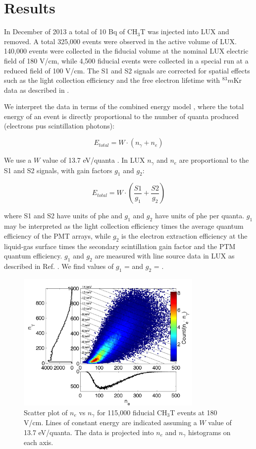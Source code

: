 \section{Results}

In December of 2013 a total of 10 Bq of CH$_3$T was injected into LUX and removed. A total 325,000 events were observed in the active volume of LUX. 140,000 events were collected in the fiducial volume at the nominal LUX electric field of 180 V/cm, while 4,500 fiducial events were collected in a special run at a reduced field of 100 V/cm. The S1 and S2 signals are corrected for spatial effects such as the light collection efficiency and the free electron lifetime with $^83m$Kr data as described in \cite{lux-reanalysis}. 

We interpret the data in terms of the combined energy model \cite{platzman}, where the total energy of an event is directly proportional to the number of quanta produced (electrons pus scintillation photons):

\begin{displaymath}
E_{total} = W \cdot (n_{\gamma} + n_e )
\end{displaymath}

\noindent
We use a $W$ value of 13.7 eV/quanta \cite{Dahl_Thesis}. In LUX $n_{\gamma}$ and $n_e$ are proportional to the S1 and S2 signals, with gain factors $g_1$ and $g_2$:

\begin{displaymath}
E_{total} = W \cdot (\frac{S1}{g_1} + \frac{S2}{g_2} )
\end{displaymath}

\noindent
where S1 and S2 have units of phe and $g_1$ and $g_2$ have units of phe per quanta. $g_1$ may be interpreted as the light collection efficiency times the average quantum efficiency of the PMT arrays, while $g_2$ is the electron extraction efficiency at the liquid-gas surface times the secondary scintillation gain factor and the PTM quantum efficiency. $g_1$ and $g_2$ are measured with line source data in LUX as described in Ref. \cite{lux-reanalysis, lux-prd}. We find values of $g_1$ = \gone and $g_2$ = \gtwo.

\begin{figure}[h!]\centering
\includegraphics[width=90mm]{fig/tritium-scatter.png}
\caption{Scatter plot of $n_e$ vs $n_{\gamma}$ for 115,000 fiducial CH$_3$T events at 180 V/cm. Lines of constant energy are indicated assuming a $W$ value of 13.7 eV/quanta. The data is projected into $n_e$ and $n_{\gamma}$ histograms on each axis.}
\label{fig:tritium-scatter}
\end{figure}


